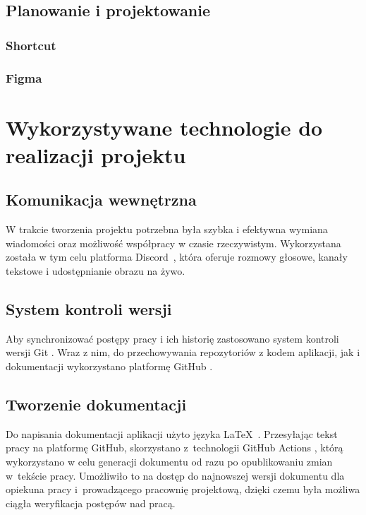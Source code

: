 \subsection{Planowanie i projektowanie}

\subsubsection{Shortcut}

\subsubsection{Figma}


\section{Wykorzystywane technologie do realizacji projektu}

\subsection{Komunikacja wewnętrzna}

W trakcie tworzenia projektu potrzebna była szybka i efektywna
wymiana wiadomości oraz możliwość współpracy w czasie rzeczywistym.
Wykorzystana została w tym celu platforma Discord~\cite{Discord},
która oferuje rozmowy głosowe, kanały tekstowe i udostępnianie
obrazu na żywo.


\subsection{System kontroli wersji}

Aby synchronizować postępy pracy i ich historię zastosowano
system kontroli wersji Git \cite{Git}. Wraz z nim, do przechowywania
repozytoriów z kodem aplikacji, jak i dokumentacji wykorzystano
platformę GitHub \cite{Github}.

\subsection{Tworzenie dokumentacji}

Do napisania dokumentacji aplikacji użyto języka \LaTeX~\cite{Latex}.
Przesyłając tekst pracy na platformę GitHub, skorzystano z~technologii
GitHub Actions \cite{GithubActions}, którą wykorzystano w celu
generacji dokumentu od razu po opublikowaniu zmian w~tekście pracy.
Umożliwiło to na dostęp do najnowszej wersji dokumentu dla opiekuna
pracy i~prowadzącego pracownię projektową, dzięki czemu była możliwa
ciągła weryfikacja postępów nad pracą.


